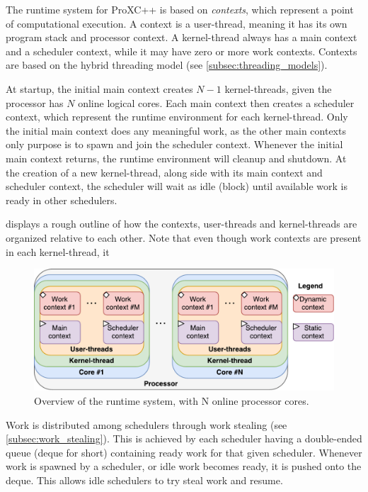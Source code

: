 The runtime system for ProXC++ is based on \textit{contexts}, which represent a point of computational execution. A context is a user\hyp{}thread, meaning it has its own program stack and processor context. A kernel\hyp{}thread always has a main context and a scheduler context, while it may have zero or more work contexts. Contexts are based on the hybrid threading model (see \cref{subsec:threading_models}).

At startup, the initial main context creates $N-1$ kernel\hyp{}threads, given the processor has $N$ online logical cores. Each main context then creates a scheduler context, which represent the runtime environment for each kernel\hyp{}thread. Only the initial main context does any meaningful work, as the other main contexts only purpose is to spawn and join the scheduler context. Whenever the initial main context returns, the runtime environment will cleanup and shutdown. At the creation of a new kernel\hyp{}thread, along side with its main context and scheduler context, the scheduler will wait as idle (block) until available work is ready in other schedulers.

 displays a rough outline of how the contexts, user\hyp{}threads and kernel\hyp{}threads are organized relative to each other. Note that even though work contexts are present in each kernel\hyp{}thread, it 

\begin{figure}[h!]
    \centering
    \includegraphics[width=0.8\linewidth]{fig/runtime_overview}
    \caption{Overview of the runtime system, with N online processor cores.}
    \label{fig:runtime_overview}
\end{figure}

Work is distributed among schedulers through work stealing (see \cref{subsec:work_stealing}). This is achieved by each scheduler having a double\hyp{}ended queue (deque for short) containing ready work for that given scheduler. Whenever work is spawned by a scheduler, or idle work becomes ready, it is pushed onto the deque. This allows idle schedulers to try steal work and resume.


